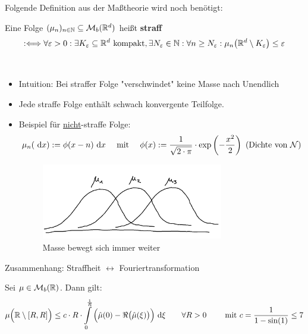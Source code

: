 Folgende Definition aus der Maßtheorie wird noch benötigt:

\begin{defi}[Straffheit]
	Eine Folge $(\mu_n)_{n\in\mathbb{N}}\subseteq\mathcal{M}_b(\mathbb{R}^d)$ heißt \textbf{straff}
	\begin{align*}
		:\Longleftrightarrow
		\forall\varepsilon>0:\exists K_\varepsilon\subseteq\mathbb{R}^d\text{ kompakt},\exists N_\varepsilon\in\mathbb{N}:\forall n\geq N_\varepsilon:
		\mu_n\big(\mathbb{R}^d\setminus K_\varepsilon\big)\leq\varepsilon
	\end{align*}
\end{defi}

\begin{bemerkung}\
	\begin{itemize}
		\item Intuition: Bei straffer Folge "verschwindet" keine Masse nach Unendlich
		\item Jede straffe Folge enthält schwach konvergente Teilfolge.
		\item Beispiel für \underline{nicht}-straffe Folge: 
		\begin{align*}
			\mu_n(\text{ d} x):=\phi(x-n)\text{ d} x
			\quad\text{ mit }\quad
			\phi(x):=\frac{1}{\sqrt{2\cdot\pi}}\cdot\exp\left(-\frac{x^2}{2}\right)\text{
			(Dichte von $\mathcal{N}$)}
		\end{align*}

		\begin{figure}[ht!]
			\begin{center}
				\includegraphics[width=0.75\textwidth]{./pics/Sketch5.png}
				\caption{Masse bewegt sich immer weiter}
				\label{AbbNichtStraffesMass}
			\end{center}
		\end{figure}
	\end{itemize}
\end{bemerkung}

Zusammenhang: Straffheit $\longleftrightarrow$ Fouriertransformation

\begin{lemma}\label{lemma8.5}
	Sei $\mu\in\mathcal{M}_b(\mathbb{R})$.
	Dann gilt:
	\begin{align*}
		\mu\Big(\mathbb{R}\setminus[R,R]\Big)\leq
		c\cdot R\cdot\int\limits_0^{\frac{1}{R}}\Big(\hat{\mu}(0)-\Re\big(\hat{\mu}(\xi)\big)\Big)\text{ d}\xi
		\qquad\forall R>0\qquad
		\text{ mit } c=\frac{1}{1-\sin(1)}\leq 7
	\end{align*}
\end{lemma}


